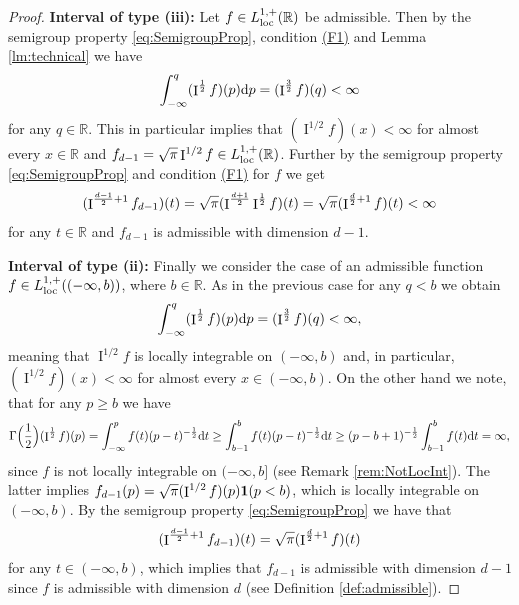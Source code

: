 \documentclass[11pt,a4paper]{article}
\theoremstyle{plain}
\theoremstyle{definition}
\theoremstyle{remark}
\def\RR{\mathbb{R}}
\newcommand{\frI}{\mathop{\mathrm{I}}\nolimits}
\newcommand{\dint}{\textup{d}}
\begin{document}
\begin{proof}
    \medskip

    \textbf{Interval of type (iii):} Let $f\in L_{\rm loc}^{1,+}(\RR)$ be admissible. Then by the semigroup property \eqref{eq:SemigroupProp}, condition \hyperref[item:F1]{(F1)} and Lemma \ref{lm:technical} we have
    \begin{align*}
        \int_{-\infty}^q(\frI^{1\over 2}f)(p)\dint p=(\frI^{3\over 2}f)(q)<\infty
    \end{align*}
    for any $q\in \RR$. This in particular implies that $(\frI^{1/2}f)(x)<\infty$ for almost every $x\in\RR$ and $f_{d-1}=\sqrt{\pi}\frI^{1/2}f\in L^{1,+}_{\rm loc}(\RR)$. Further by the semigroup property \eqref{eq:SemigroupProp} and condition \hyperref[item:F1]{(F1)} for $f$ we get
    \[
        (\frI^{{d-1\over 2}+1}f_{d-1})(t)=\sqrt{\pi}(\frI^{{d+1\over 2}}\frI^{{1\over 2}}f)(t)=\sqrt{\pi}(\frI^{{d\over 2}+1}f)(t)<\infty
    \]
    for any $t\in\RR$ and $f_{d-1}$ is admissible with dimension $d-1$.

    \medskip

    \textbf{Interval of type (ii):} Finally we consider the case of an admissible function $f\in L_{\rm loc}^{1,+}((-\infty,b))$, where $b\in\RR$. As in the previous case for any $q<b$ we obtain
    $$
        \int_{-\infty}^q(\frI^{1\over 2}f)(p)\dint p=(\frI^{3\over 2}f)(q)<\infty,
    $$
    meaning that $\frI^{1/2}f$ is locally integrable on $(-\infty,b)$ and, in particular, $(\frI^{1/2}f)(x)<\infty$ for almost every $x\in (-\infty,b)$. On the other hand we note, that for any $p\ge b$ we have
    $$
        \Gamma\Big({1\over 2}\Big)(\frI^{1\over 2}f)(p)=\int_{-\infty}^pf(t)(p-t)^{-{1\over 2}}\dint t\ge \int_{b-1}^bf(t)(p-t)^{-{1\over 2}}\dint t \ge (p-b+1)^{-{1\over 2}}\int_{b-1}^bf(t)\dint t=\infty,
    $$
    since $f$ is not locally integrable on $(-\infty,b]$ (see Remark \ref{rem:NotLocInt}). The latter implies $f_{d-1}(p)=\sqrt{\pi}(\frI^{1/2}f)(p){\bf 1}(p<b)$, which is locally integrable on $(-\infty, b)$. By the semigroup property \eqref{eq:SemigroupProp} we have that 
    \[
        (\frI^{{d-1\over 2}+1}f_{d-1})(t)=\sqrt{\pi}(\frI^{{d\over 2}+1}f)(t)
    \]
    for any $t\in(-\infty,b)$, which implies that $f_{d-1}$ is admissible with dimension $d-1$ since $f$ is admissible with dimension $d$ (see Definition \ref{def:admissible}).

    \medskip


\end{proof}
\end{document}
